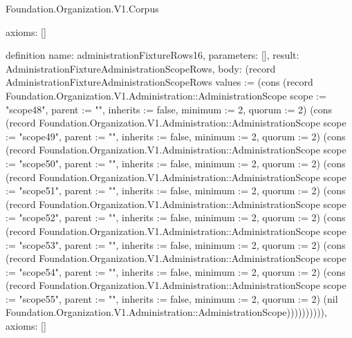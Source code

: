 \begin{lexlean}{Foundation.Organization.V1.Corpus}
\begin{semanticmodule}
{  axioms: []
}

definition{
  name: administrationFixtureRows16,
  parameters: [],
  result: AdministrationFixtureAdministrationScopeRows,
  body: (record AdministrationFixtureAdministrationScopeRows {values := (cons (record Foundation.Organization.V1.Administration::AdministrationScope {scope := "scope48", parent := "", inherits := false, minimum := 2, quorum := 2}) (cons (record Foundation.Organization.V1.Administration::AdministrationScope {scope := "scope49", parent := "", inherits := false, minimum := 2, quorum := 2}) (cons (record Foundation.Organization.V1.Administration::AdministrationScope {scope := "scope50", parent := "", inherits := false, minimum := 2, quorum := 2}) (cons (record Foundation.Organization.V1.Administration::AdministrationScope {scope := "scope51", parent := "", inherits := false, minimum := 2, quorum := 2}) (cons (record Foundation.Organization.V1.Administration::AdministrationScope {scope := "scope52", parent := "", inherits := false, minimum := 2, quorum := 2}) (cons (record Foundation.Organization.V1.Administration::AdministrationScope {scope := "scope53", parent := "", inherits := false, minimum := 2, quorum := 2}) (cons (record Foundation.Organization.V1.Administration::AdministrationScope {scope := "scope54", parent := "", inherits := false, minimum := 2, quorum := 2}) (cons (record Foundation.Organization.V1.Administration::AdministrationScope {scope := "scope55", parent := "", inherits := false, minimum := 2, quorum := 2}) (nil Foundation.Organization.V1.Administration::AdministrationScope)))))))))}),
  axioms: []
}


\end{semanticmodule}
\end{lexlean}
